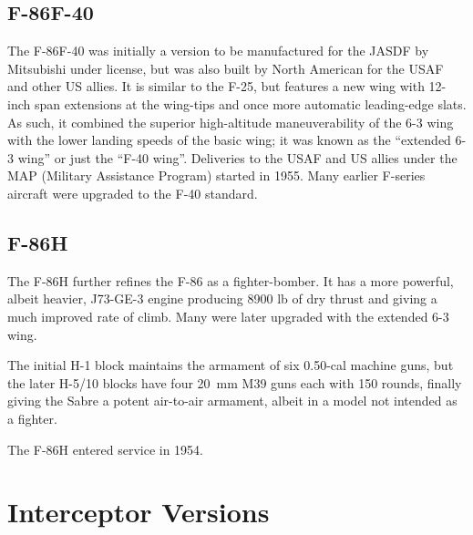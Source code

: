\subsection{F-86F-40}

The F-86F-40 was initially a version to be manufactured for the JASDF by Mitsubishi under license, but was also built by North American for the USAF and other US allies. It is similar to the F-25, but features a new wing with 12-inch span extensions at the wing-tips and once more automatic leading-edge slats. As such, it combined the superior high-altitude maneuverability of the 6-3 wing with the lower landing speeds of the basic wing; it was known as the “extended 6-3 wing” or just the “F-40 wing”. Deliveries to the USAF and US allies under the MAP (Military Assistance Program) started in 1955. Many earlier F-series aircraft were upgraded to the F-40 standard.%

\subsection{F-86H}

The F-86H further refines the F-86 as a fighter-bomber. It has a more powerful, albeit heavier, J73-GE-3 engine producing 8900 lb of dry thrust and giving a much improved rate of climb. Many were later upgraded with the extended 6-3 wing.%

The initial H-1 block maintains the armament of six 0.50-cal machine guns, but the later H-5/10 blocks have four 20~mm M39 guns each with 150 rounds, finally giving the Sabre a potent air-to-air armament, albeit in a model not intended as a fighter.

The F-86H entered service in 1954.

\section{Interceptor Versions}

